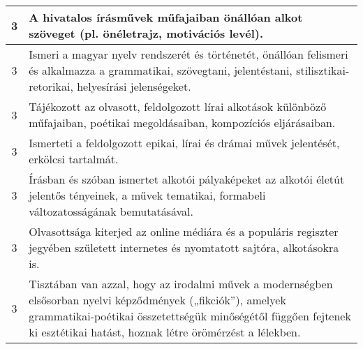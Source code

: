 \begin{longtable}{c | p{12cm} }
                                
                                          3 &  A hivatalos írásművek műfajaiban önállóan alkot szöveget (pl. önéletrajz, motivációs levél). \\ \hline
                                          3 &  Ismeri a magyar nyelv rendszerét és történetét, önállóan felismeri és alkalmazza a grammatikai, szövegtani, jelentéstani, stilisztikai-retorikai, helyesírási jelenségeket. \\ \hline
                                          3 &  Tájékozott az olvasott, feldolgozott lírai alkotások különböző műfajaiban, poétikai megoldásaiban, kompozíciós eljárásaiban. \\ \hline
                                          3 &  Ismerteti a feldolgozott epikai, lírai és drámai művek jelentését, erkölcsi tartalmát. \\ \hline
                                          3 &  Írásban és szóban ismertet alkotói pályaképeket az alkotói életút jelentős tényeinek, a művek tematikai, formabeli változatosságának bemutatásával. \\ \hline
                                          3 &  Olvasottsága kiterjed az online médiára és a populáris regiszter jegyében született internetes és nyomtatott sajtóra, alkotásokra is. \\ \hline
                                          3 &  Tisztában van azzal, hogy az irodalmi művek a modernségben elsősorban nyelvi képződmények („fikciók”), amelyek grammatikai-poétikai összetettségük minőségétől függően fejtenek ki esztétikai hatást, hoznak létre örömérzést a lélekben. \\ \hline
                                      

\end{longtable}
